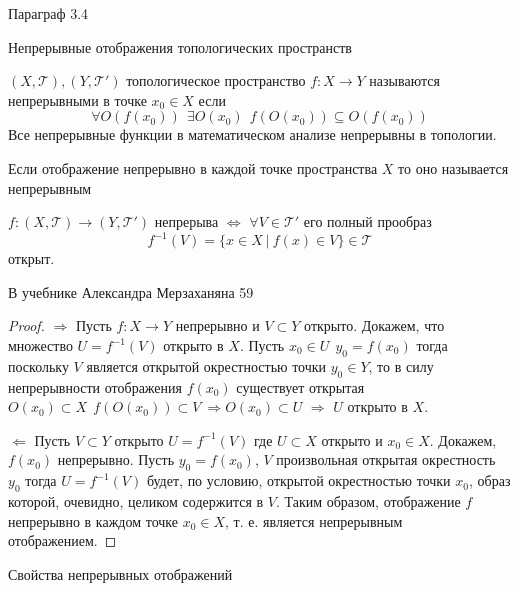 \begin{title}[\Large]
  Параграф 3.4
\end{title}

\begin{title}[\Large]
  Непрерывные отображения топологических пространств
\end{title}

\begin{define}[непрерывности]
  $(X, \mathcal{T}), (Y, \mathcal{T}')$ топологическое пространство
  $f: X \to Y$ называются непрерывными в точке $x_0 \in X$ если
  $$
  \forall O(f(x_0)) ~~ \exists O(x_0) ~~ f(O(x_0)) \subseteq O(f(x_0))
  $$
  Все непрерывные функции в математическом анализе непрерывны в топологии.

  Если отображение непрерывно в каждой точке пространства $X$ то оно
  называется непрерывным
\end{define}

\begin{theorem}
  $f:(X, \mathcal{T}) \to (Y, \mathcal{T}')$ непрерыва
  $\Leftrightarrow$ $\forall V \in \mathcal{T}'$ его полный прообраз
  $$
  f^{-1}(V) = \{ x \in X ~ | ~ f(x) \in V \} \in \mathcal{T}
  $$
  открыт.

  В учебнике Александра Мерзаханяна 59
\end{theorem}

\begin{proof}
  $\Rightarrow$ Пусть $f: X \to Y$ непрерывно и $V \subset Y$ открыто. Докажем,
  что множество $U = f^{-1}(V)$ открыто в $X$.
  Пусть $x_0 \in U ~~ y_0 = f(x_0)$ тогда поскольку $V$ является
  открытой окрестностью точки $y_0 \in Y$, то в силу непрерывности
  отображения $f(x_0)$ существует открытая $O(x_0) \subset X ~~
  f(O(x_0))\subset V ~ \Rightarrow O(x_0) \subset U$ $\Rightarrow$ $U$ открыто в $X$.

  $\Leftarrow$ Пусть $V \subset Y$ открыто $U = f^{-1}(V)$ где $U \subset X$ открыто
  и $x_0 \in X$. Докажем, $f(x_0)$ непрерывно. Пусть
  $y_0 = f(x_0)$, $V$ произвольная открытая окрестность $y_0$ тогда
  $U = f^{-1}(V)$ будет, по условию, открытой окрестностью точки $x_0$, образ
  которой, очевидно, целиком содержится в $V$. Таким образом, отображение $f$
  непрерывно в каждом точке $x_0 \in X$, т. е. является непрерывным отображением.
\end{proof}

\begin{title}[\Large]
  Свойства непрерывных отображений
\end{title}

